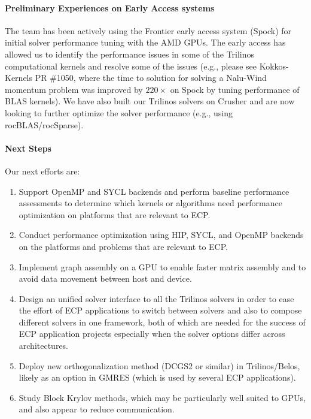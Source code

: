 \paragraph{Preliminary Experiences on Early Access systems}

The team has been actively using the Frontier early access system (Spock) for initial solver performance tuning with the AMD GPUs.
The early access has allowed us to identify the performance issues in some of the Trilinos computational kernels
and resolve some of the issues
(e.g., please see Kokkos-Kernels PR \#1050, where the time to solution
for solving a Nalu-Wind momentum problem was improved by $220\times$
on Spock by tuning performance of BLAS kernels).
We have also built our Trilinos solvers on Crusher and are now looking to
further optimize the solver performance (e.g., using rocBLAS/rocSparse).


\paragraph{Next Steps}
Our next efforts are:
\begin{enumerate}
\item Support OpenMP and SYCL backends and
      perform baseline performance assessments to determine which kernels or algorithms need performance optimization
      on platforms that are relevant to ECP.
\item Conduct performance optimization using HIP, SYCL, and OpenMP backends on the platforms and problems
      that are relevant to ECP.
\item Implement graph assembly on a GPU to enable faster matrix assembly and to avoid data movement between host and device.
\item Design an unified solver interface to all the Trilinos solvers in order to ease the effort of ECP applications
      to switch between solvers and also to compose different solvers in one framework, both of which are needed for the success of ECP application projects especially when the solver options differ across architectures.
\item Deploy new orthogonalization method (DCGS2 or similar) in Trilinos/Belos, likely as an option in GMRES (which is used by several ECP applications).
\item Study Block Krylov methods, which may be particularly well suited to GPUs, and also appear to reduce communication.
\end{enumerate}

